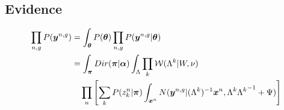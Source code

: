\documentclass[a4paper]{article}
\begin{document}
\subsection{Evidence}
\begin{align}
  \prod_{n,g}P(\boldsymbol{y}^{n,g})&=\int_{\boldsymbol{\theta}}P(\boldsymbol{\theta})\prod_{n,g}P(\boldsymbol{y}^{n,g}|\boldsymbol{\theta}) \\
                   &=\int_{\boldsymbol{\pi}}Dir(\boldsymbol{\pi}|\boldsymbol{\alpha})\int_\Lambda\prod_k\mathcal{W}(\Lambda^k|W,\nu) \\
                   &\quad\prod_n\left[\sum_k P(z_k^n|\boldsymbol{\pi})\int_{\boldsymbol{x}^n}N(\boldsymbol{y}^{n,g}|(\Lambda^k)^{-1} \boldsymbol{x}^n,\Lambda^k{\Lambda^k}^{-1}+\Psi)\right]
\end{align}
\end{document}
